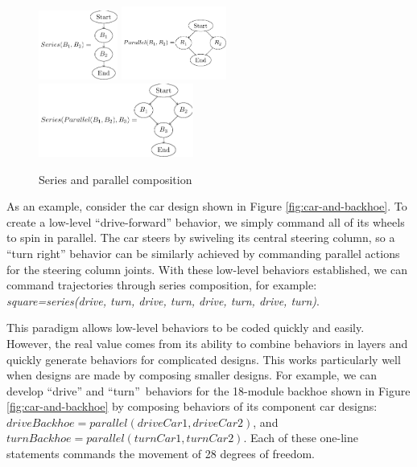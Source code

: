 \documentclass[graybox]{svmult}
\begin{document}
\begin{figure}
\begin{center}
\includegraphics[height=0.9in]{images/tikz/series.pdf}
\includegraphics[height=0.95in]{images/tikz/parallel.pdf} \vspace{0.in}
\includegraphics[height=0.95in]{images/tikz/parallel-and-series.pdf}
\end{center}
\caption{Series and parallel composition}
\label{fig:graph-composition}
\end{figure}

As an example, consider the car design shown in Figure \ref{fig:car-and-backhoe}. To create a low-level
``drive-forward'' behavior, we simply command all of its wheels to spin  in parallel.
The car steers by swiveling its central steering column, so a ``turn right''
behavior can be similarly achieved by commanding parallel actions for the steering column joints.
With these low-level behaviors established, we can command trajectories through series
composition, for example: \textit{square=series(drive, turn, drive, turn, drive, turn,
drive, turn)}.

This paradigm  allows  low-level behaviors to be coded quickly and
easily. However, the real value comes from its ability to  combine behaviors
in layers and quickly generate behaviors for complicated designs. This works
particularly well when designs are made by composing smaller designs. For
example, we can develop ``drive'' and ``turn''\ behaviors for the
18-module backhoe shown in Figure \ref{fig:car-and-backhoe} by composing  behaviors of
its component car designs: \(driveBackhoe= parallel( driveCar1, driveCar2)\),
and \(turnBackhoe = parallel(turnCar1, turnCar2)\). Each of these one-line
statements commands the movement of  28 degrees of freedom.
\end{document}
